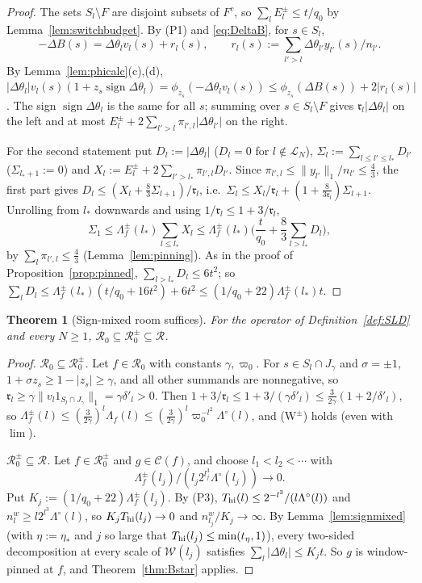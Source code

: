 \documentclass[10pt]{amsart}
\newtheorem{theorem}{Theorem}[section]
\theoremstyle{definition}
\theoremstyle{remark}
\newcommand{\sgn}{\operatorname{sign}}
\newcommand{\Cset}{\mathcal C}
\newcommand{\Rec}{\mathcal R}
\begin{document}
\begin{proof}
The sets $S_l\setminus F$ are disjoint subsets of $F^c$, so $\sum_lE^\pm_l
\le t/q_0$ by Lemma~\ref{lem:switchbudget}.  By (P1) and
\eqref{eq:DeltaB}, for $s\in S_l$,
\[
 -\Delta B(s)=\Delta\theta_lv_l(s)+r_l(s),\qquad r_l(s):=\sum_{l'>l}
 \Delta\theta_{l'}y_{l'}(s)/n_{l'} .
\]
By Lemma~\ref{lem:phicalc}(c),(d), $|\Delta\theta_l|v_l(s)(1+z_s\sgn
\Delta\theta_l)=\phi_{z_s}(-\Delta\theta_lv_l(s))\le\phi_{z_s}(\Delta B(s))+
2|r_l(s)|$.  The sign $\sgn\Delta\theta_l$ is the same for all $s$; summing
over $s\in S_l\setminus F$ gives $\mathfrak r_l|\Delta\theta_l|$ on the left
and at most $E^\pm_l+2\sum_{l'>l}\pi_{l',l}|\Delta\theta_{l'}|$ on the right.

For the second statement put $D_l:=|\Delta\theta_l|$ ($D_l=0$ for
$l\notin\mathcal L_N$), $\Sigma_l:=\sum_{l\le l'\le l_*}D_{l'}$
($\Sigma_{l_*+1}:=0$) and $X_l:=E^\pm_l+2\sum_{l'>l_*}\pi_{l',l}D_{l'}$.
Since $\pi_{l',l}\le\|y_{l'}\|_1/n_{l'}\le\frac43$, the first part gives
$D_l\le(X_l+\frac83\Sigma_{l+1})/\mathfrak r_l$, i.e.\
$\Sigma_l\le X_l/\mathfrak r_l+(1+\frac8{3\mathfrak r_l})\Sigma_{l+1}$.
Unrolling from $l_*$ downwards and using $1/\mathfrak r_l\le1+3/\mathfrak
r_l$,
\[
 \Sigma_1\le\Lambda^\pm_f(l_*)\sum_{l\le l_*}X_l\le\Lambda^\pm_f(l_*)
 \Big(\frac t{q_0}+\frac83\sum_{l>l_*}D_l\Big),
\]
by $\sum_l\pi_{l',l}\le\frac43$ (Lemma~\ref{lem:pinning}).  As in the proof
of Proposition~\ref{prop:pinned}, $\sum_{l>l_*}D_l\le6t^2$; so
$\sum_lD_l\le\Lambda^\pm_f(l_*)(t/q_0+16t^2)+6t^2\le(1/q_0+22)
\Lambda^\pm_f(l_*)t$.
\end{proof}

\begin{theorem}[Sign-mixed room suffices]\label{thm:Bpm}
For the operator of Definition~\ref{def:SLD} and every $N\ge1$,
$\mathcal R_0\subseteq\mathcal R_0^\pm\subseteq\Rec$.
\end{theorem}

\begin{proof}
\emph{$\mathcal R_0\subseteq\mathcal R_0^\pm$.}  Let $f\in\mathcal R_0$
with constants $\gamma,\varpi_0$.  For $s\in S_l\cap J_\gamma$ and
$\sigma=\pm1$, $1+\sigma z_s\ge1-|z_s|\ge\gamma$, and all other summands
are nonnegative, so $\mathfrak r_l\ge\gamma\|v_l1_{S_l\cap J_\gamma}\|_1=
\gamma\delta'_l>0$.  Then $1+3/\mathfrak r_l\le1+3/(\gamma\delta'_l)\le
\frac3{2\gamma}(1+2/\delta'_l)$, so $\Lambda^\pm_f(l)\le(\frac3{2\gamma})^l
\Lambda_f(l)\le(\frac3{2\gamma})^l\varpi_0^{-l^2}\Lambda^\circ(l)$, and
(W$^\pm$) holds (even with $\lim$).

\emph{$\mathcal R_0^\pm\subseteq\Rec$.}  Let $f\in\mathcal R_0^\pm$
and $g\in\Cset(f)$, and choose $l_1<l_2<\cdots$ with
\[
 \Lambda^\pm_f(l_j)/(l_j2^{l_j^3}\Lambda^\circ(l_j))\to0 .
\]
Put $K_j:=(1/q_0+22)
\Lambda^\pm_f(l_j)$.  By (P3), $T_{\rm hi}(l)\le2^{-l^3}/(l\Lambda^\circ(l))$
and $n^w_l\ge l2^{l^3}\Lambda^\circ(l)$, so $K_jT_{\rm hi}(l_j)\to0$ and
$n^w_{l_j}/K_j\to\infty$.  By Lemma~\ref{lem:signmixed} (with $\eta:=\eta_*$
and $j$ so large that $T_{\rm hi}(l_j)\le\min(t_\eta,1)$), every two-sided
decomposition at every scale of $\mathcal W(l_j)$ satisfies
$\sum_l|\Delta\theta_l|\le K_jt$.  So $g$ is window-pinned at $f$, and
Theorem~\ref{thm:Bstar} applies.
\end{proof}
\end{document}
